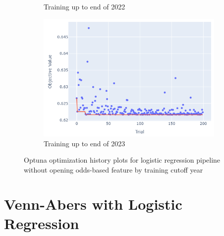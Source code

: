 \documentclass[12pt,twoside]{report}
\begin{document}
\begin{figure}[htb]
\begin{subfigure}{.33\linewidth}
  \caption{Training up to end of 2022}
\end{subfigure}%
\begin{subfigure}{.33\linewidth}
  \centering
  \includegraphics[width=0.95\linewidth]{figures/lr_no_odds_cutoff_2023.png}
  \caption{Training up to end of 2023}
\end{subfigure}
\par\bigskip
\caption{Optuna optimization history plots for logistic regression pipeline without opening odds-based feature by training cutoff year}
\end{figure}

\newpage
\section{Venn-Abers with Logistic Regression}
\end{document}
